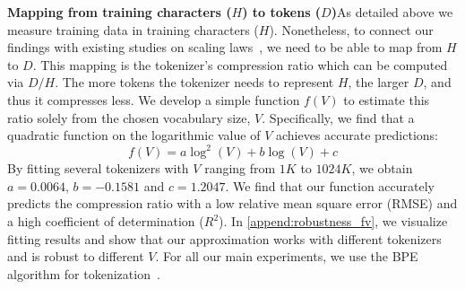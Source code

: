 {\textbf{Mapping from training characters ($H$) to tokens ($D$)}\;\;\;\;As detailed above we measure training data in training characters ($H$). Nonetheless, to connect our findings with existing studies on scaling laws~\citep{hoffmann2022training,muennighoff2024scaling}, we need to be able to map from $H$ to $D$. This mapping is the tokenizer's compression ratio which can be computed via $D/H$. The more tokens the tokenizer needs to represent $H$, the larger $D$, and thus it compresses less. We develop a simple function $f(V)$ to estimate this ratio solely from the chosen vocabulary size, $V$. Specifically, we find that a quadratic function on the logarithmic value of $V$ achieves accurate predictions:
\begin{equation}
\label{eq:fv}
    f(V) = a \log^2(V) + b\log (V) + c
\end{equation}
By fitting several tokenizers with $V$ ranging from $1K$ to $1024K$, we obtain $a=0.0064$, $b=-0.1581$ and $c=1.2047$. We find that our function accurately predicts the compression ratio with a low relative mean square error (RMSE) and a high coefficient of determination ($R^2$). In \autoref{append:robustness_fv}, we visualize fitting results and show that our approximation works with different tokenizers and is robust to different $V$. For all our main experiments, we use the BPE algorithm for tokenization~\citep{bpe2016}.


}
